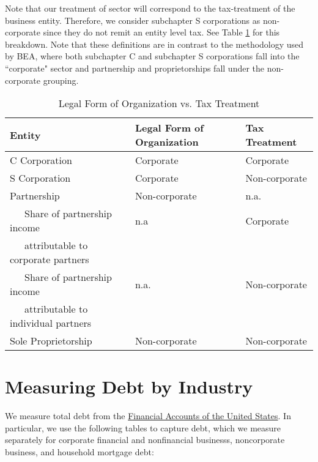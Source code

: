 \documentclass[article,11pt,letterpaper,fleqn]{article}
\theoremstyle{definition}
\numberwithin{equation}{section}
\begin{document}


 Note that our treatment of sector will correspond to the tax-treatment of the business entity.  Therefore, we consider subchapter S corporations as non-corporate since they do not remit an entity level tax.  See Table \ref{tab:org_form} for this breakdown.  Note that these definitions are in contrast to the methodology used by BEA, where both subchapter C and subchapter S corporations fall into the ``corporate" sector and partnership and proprietorships fall under the non-corporate grouping.  

\begin{table}[htbp]
  \centering
  \caption{Legal Form of Organization vs. Tax Treatment}
    \begin{tabular}{lll}
    \hline
    \hline
    Entity & Legal Form of Organization & Tax Treatment \\
   \hline
    C Corporation & Corporate & Corporate \\
    S Corporation & Corporate & Non-corporate \\
    Partnership & Non-corporate & n.a. \\
    \ \ \ Share of partnership income & n.a   & Corporate \\
    \ \ \ attributable to corporate partners & &  \\
    \ \ \ Share of partnership income& n.a.  & Non-corporate \\
    \ \ \ attributable to individual partners &  &  \\
    Sole Proprietorship & Non-corporate & Non-corporate \\
    \hline
    \hline
    \end{tabular}%
  \label{tab:org_form}%
\end{table}%


\section{Measuring Debt by Industry}
\label{sec:step3}

We measure total debt from the \href{http://www.federalreserve.gov/apps/fof/FOFTables.aspx}{Financial Accounts of the United States}.  In particular, we use the following tables to capture debt, which we measure separately for corporate financial and nonfinancial businesss, noncorporate business, and household mortgage debt:
\end{document}
